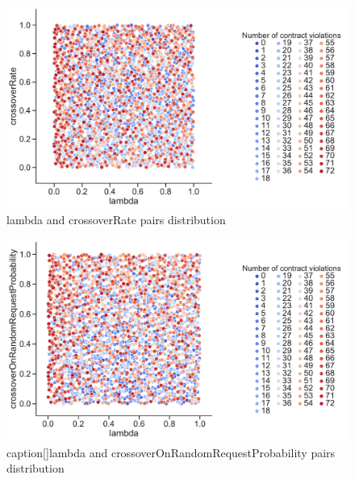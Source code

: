 \begin{figure}
	\centering
	\includegraphics[width=\textwidth]{images/PairsDistr/lambda_crossoverRate.pdf}
	\caption[]{lambda and crossoverRate pairs distribution}
	\label{fig:lambda_crossoverRate_pair}
\end{figure}

\begin{figure}
	\centering
	\includegraphics[width=\textwidth]{images/PairsDistr/lambda_crossoverOnRandomRequestProbability.pdf}
	\\caption[]{lambda and crossoverOnRandomRequestProbability pairs distribution}
	\label{fig:lambda_crossoverOnRandomRequestProbability_pair}
\end{figure}

